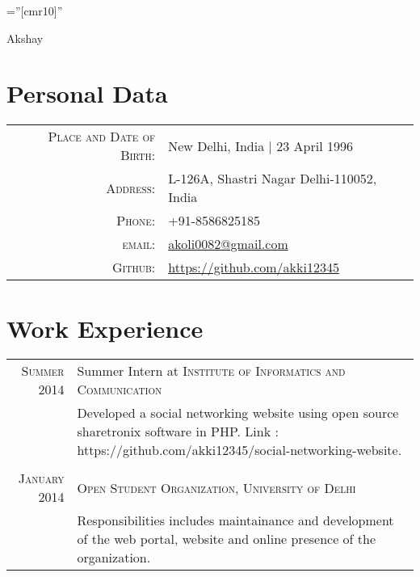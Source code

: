 \documentclass[a4paper,10pt]{article}
\begin{document}

\pagestyle{empty} %

\font\fb=''[cmr10]'' %

\par{\centering
		{\Huge Akshay
	}\bigskip\par}

\section{Personal Data}

\begin{tabular}{rl}
    \textsc{Place and Date of Birth:} & New Delhi, India  | 23 April 1996 \\
    \textsc{Address:}   & L-126A, Shastri Nagar Delhi-110052, India \\
    \textsc{Phone:}     & +91-8586825185\\
    \textsc{email:}     & \href{mailto:akoli0082@gmail.com}{akoli0082@gmail.com}\\
        \textsc{Github:}     & \href{https://github.com/akki12345}{https://github.com/akki12345}
\end{tabular}

\section{Work Experience}
\begin{tabular}{r|p{11cm}}
\textsc{Summer 2014} & Summer Intern at \textsc{Institute of Informatics and Communication}\\&\footnotesize{Developed a social networking website using open source sharetronix software in PHP.
Link : https://github.com/akki12345/social-networking-website.}\\\\
\textsc{January 2014} & \textsc{Open Student Organization, University of Delhi}\\&\footnotesize{Responsibilities includes maintainance and development of the web portal, website and online presence of the organization.}\\
\end{tabular}
\end{document}
